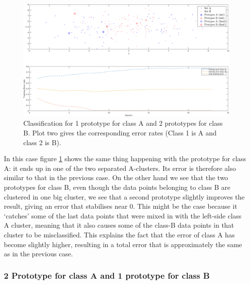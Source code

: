 \documentclass[10pt]{article}
\begin{document}
\begin{figure}[H]
 \centering
 \includegraphics[width=\textwidth]{Fig12_b.png}
 \caption{Classification for 1 prototype for class A and 2 prototypes for class B. Plot two gives the corresponding error rates (Class 1 is A and class 2 is B).}
 \label{fig1.12b}
\end{figure}
In this case figure \ref{fig1.12b} shows the same thing happening with the prototype for class A: it ends up in one of the two separated A-clusters. Its error is therefore also similar to that in the previous case. On the other hand we see that the two prototypes for class B, even though the data points belonging to class B are clustered in one big cluster, we see that a second prototype slightly improves the result, giving an error that stabilises near 0. This might be the case because it `catches' some of the last data points that were mixed in with the left-side class A cluster, meaning that it also causes some of the class-B data points in that cluster to be misclassified. This explains the fact that the error of class A has become slightly higher, resulting in a total error that is approximately the same as in the previous case.

\subsubsection{2 Prototype for class A and 1 prototype for class B}
\end{document}
